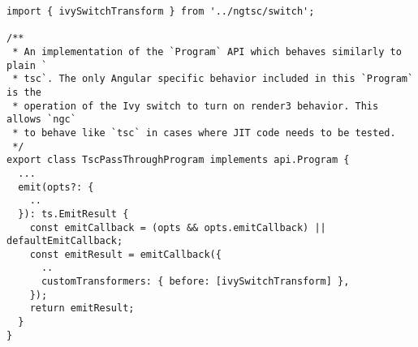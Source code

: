 \begin{verbatim}
import { ivySwitchTransform } from '../ngtsc/switch';

/**
 * An implementation of the `Program` API which behaves similarly to plain `
 * tsc`. The only Angular specific behavior included in this `Program` is the
 * operation of the Ivy switch to turn on render3 behavior. This allows `ngc`
 * to behave like `tsc` in cases where JIT code needs to be tested.
 */
export class TscPassThroughProgram implements api.Program {
  ...
  emit(opts?: {
    ..
  }): ts.EmitResult {
    const emitCallback = (opts && opts.emitCallback) || defaultEmitCallback;
    const emitResult = emitCallback({
      ..
      customTransformers: { before: [ivySwitchTransform] },
    });
    return emitResult;
  }
}
\end{verbatim}
